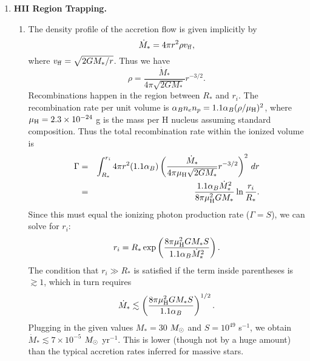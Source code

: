 \solutionset

\begin{enumerate}

\item \textbf{HII Region Trapping.}

\begin{enumerate}

\item The density profile of the accretion flow is given implicitly by
\begin{displaymath}
\dot{M}_* = 4\pi r^2 \rho v_{\rm ff},
\end{displaymath}
where $v_{\rm ff} = \sqrt{2 G M_*/r}$. Thus we have
\begin{displaymath}
\rho = \frac{\dot{M}_*}{4\pi \sqrt{2G M_*}} r^{-3/2}.
\end{displaymath}
Recombinations happen in the region between $R_*$ and $r_i$. The recombination rate per unit volume is $\alpha_B n_e n_p = 1.1 \alpha_B (\rho/\mu_{\rm H})^2$, where $\mu_{\rm H} =2.3\times 10^{-24}$ g is the mass per H nucleus assuming standard composition. Thus the total recombination rate within the ionized volume is
\begin{eqnarray*}
\Gamma & = & \int_{R_*}^{r_i} 4\pi r^2 (1.1\alpha_B) \left(\frac{\dot{M}_*}{4\pi \mu_{\rm H} \sqrt{2G M_*}} r^{-3/2}\right)^2 \, dr \\
& = & \frac{1.1\alpha_B \dot{M}_*^2}{8\pi \mu_{\rm H}^2 G M_*} \ln \frac{r_i}{R_*}.
\end{eqnarray*}
Since this must equal the ionizing photon production rate ($\Gamma = S$), we can solve for $r_i$:
\begin{displaymath}
r_i = R_* \exp\left(\frac{8\pi \mu_{\rm H}^2 G M_* S}{1.1 \alpha_B \dot{M}_*^2}\right).
\end{displaymath}
The condition that $r_i \gg R_*$ is satisfied if the term inside parentheses is $\gtrsim 1$, which in turn requires
\begin{displaymath}
\dot{M}_* \lesssim \left(\frac{8\pi \mu_{\rm H}^2 G M_* S}{1.1 \alpha_B}\right)^{1/2}.
\end{displaymath}
Plugging in the given values $M_* = 30$ $M_{\odot}$ and $S=10^{49}$ s$^{-1}$, we obtain $\dot{M}_* \lesssim 7\times 10^{-5}$ $M_{\odot}$ yr$^{-1}$. This is lower (though not by a huge amount) than the typical accretion rates inferred for massive stars.


\end{enumerate}
\end{enumerate}
